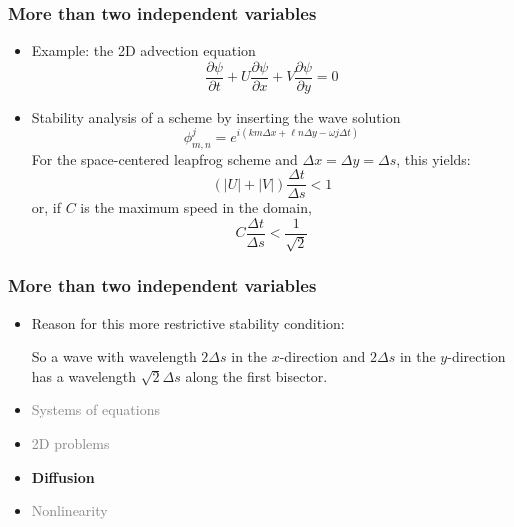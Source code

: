 \documentclass[aspectratio=149,9pt]{beamer}
\begin{document}
%
%
\begin{frame}
	\frametitle{More than two independent variables}
	\begin{itemize}
		\item Example: the 2D advection equation
			\begin{equation*}
				\frac{\partial \psi}{\partial t}+U\frac{\partial \psi}{\partial x}+V\frac{\partial \psi}{\partial y}=0
			\end{equation*}
		\item Stability analysis of a scheme by inserting the wave solution
			\begin{equation*}
				\phi^j_{m,n}=e^{i(km\Delta x+\ell n \Delta y-\omega j \Delta t)}
			\end{equation*}
			For the space-centered leapfrog scheme and $\Delta x =\Delta y=\Delta s$, this yields:
			\begin{equation*}
				(|U|+|V|)\frac{\Delta t}{\Delta s} < 1
			\end{equation*}
			or, if $C$ is the maximum speed in the domain,
			\begin{equation*}
				C\frac{\Delta t}{\Delta s} < \frac{1}{\sqrt{2}}
			\end{equation*}
	\end{itemize}
\end{frame}
%
%
\begin{frame}
	\frametitle{More than two independent variables}
	\begin{itemize}
		\item Reason for this more restrictive stability condition:
			\begin{center}
				\scalebox{.6}{\small}
			\end{center}
			So a wave with wavelength $2\Delta s$ in the $x$-direction and $2\Delta s$ in the $y$-direction has a wavelength $\sqrt{2}\Delta s$ along the first bisector.
	\end{itemize}
\end{frame}
%
%
\begin{frame}
	\begin{itemize}
		\item \textcolor{gray}{Systems of equations}
		\item \textcolor{gray}{2D problems}
		\item {\bfseries Diffusion}
		\item \textcolor{gray}{Nonlinearity}
	\end{itemize}
\end{frame}
\end{document}
